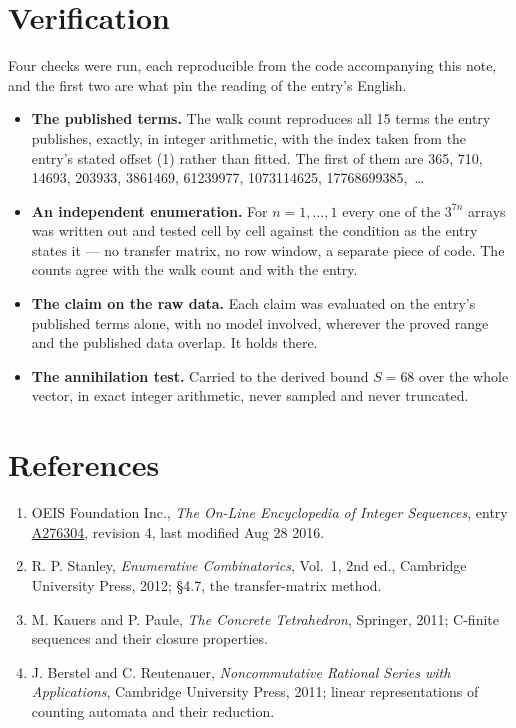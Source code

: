 \documentclass[11pt]{article}
\theoremstyle{definition}
\begin{document}
\section{Verification}

Four checks were run, each reproducible from the code accompanying this note, and the first two are what pin the reading of the entry's English.

\begin{itemize}

\item {\bfseries The published terms.} The walk count reproduces all 15 terms the entry publishes, exactly, in integer arithmetic, with the index taken from the entry's stated offset (1) rather than fitted. The first of them are 365, 710, 14693, 203933, 3861469, 61239977, 1073114625, 17768699385,~\dots

\item {\bfseries An independent enumeration.} For $n = 1,\dots,1$ every one of the $3^{7n}$ arrays was written out and tested cell by cell against the condition as the entry states it --- no transfer matrix, no row window, a separate piece of code. The counts agree with the walk count and with the entry.

\item {\bfseries The claim on the raw data.} Each claim was evaluated on the entry's published terms alone, with no model involved, wherever the proved range and the published data overlap. It holds there.

\item {\bfseries The annihilation test.} Carried to the derived bound $S = 68$ over the whole vector, in exact integer arithmetic, never sampled and never truncated.

\end{itemize}

\section{References}

\begin{enumerate}

\item OEIS Foundation Inc., \emph{The On-Line Encyclopedia of Integer Sequences}, entry \href{https://oeis.org/A276304}{A276304}, revision 4, last modified Aug 28 2016.

\item R. P. Stanley, \emph{Enumerative Combinatorics}, Vol.~1, 2nd ed., Cambridge University Press, 2012; \S4.7, the transfer-matrix method.

\item M. Kauers and P. Paule, \emph{The Concrete Tetrahedron}, Springer, 2011; C-finite sequences and their closure properties.

\item J. Berstel and C. Reutenauer, \emph{Noncommutative Rational Series with Applications}, Cambridge University Press, 2011; linear representations of counting automata and their reduction.

\end{enumerate}
\end{document}

